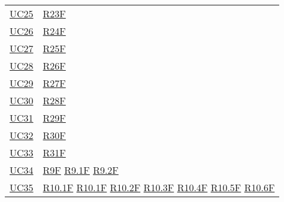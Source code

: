 \begin{center}
\begin{longtable}[!h]{m{50px} m{50px}}
        \hyperref[sec:UC25]{UC25}         & \hyperref[tab:RequisitiFunzionali]{R23F}    \\

        \hyperref[sec:UC26]{UC26}         & \hyperref[tab:RequisitiFunzionali]{R24F}    \\

        \hyperref[sec:UC27]{UC27}         & \hyperref[tab:RequisitiFunzionali]{R25F}    \\

        \hyperref[sec:UC28]{UC28}         & \hyperref[tab:RequisitiFunzionali]{R26F}    \\

        \hyperref[sec:UC29]{UC29}         & \hyperref[tab:RequisitiFunzionali]{R27F}    \\

        \hyperref[sec:UC30]{UC30}         & \hyperref[tab:RequisitiFunzionali]{R28F}    \\

        \hyperref[sec:UC31]{UC31}         & \hyperref[tab:RequisitiFunzionali]{R29F}    \\

        \hyperref[sec:UC32]{UC32}         & \hyperref[tab:RequisitiFunzionali]{R30F}    \\

        \hyperref[sec:UC33]{UC33}         & \hyperref[tab:RequisitiFunzionali]{R31F}    \\

        \hyperref[sec:UC34]{UC34}         & \hyperref[tab:RequisitiFunzionali]{R9F}
        \newline \hyperref[tab:RequisitiFunzionali]{R9.1F}
        \newline \hyperref[tab:RequisitiFunzionali]{R9.2F}                              \\

        \hyperref[sec:UC35]{UC35}         & \hyperref[tab:RequisitiFunzionali]{R10.1F}
        \newline \hyperref[tab:RequisitiFunzionali]{R10.1F}
        \newline \hyperref[tab:RequisitiFunzionali]{R10.2F}
        \newline \hyperref[tab:RequisitiFunzionali]{R10.3F}
        \newline \hyperref[tab:RequisitiFunzionali]{R10.4F}
        \newline \hyperref[tab:RequisitiFunzionali]{R10.5F}
        \newline \hyperref[tab:RequisitiFunzionali]{R10.6F}                             \\


\end{longtable}
\end{center}
